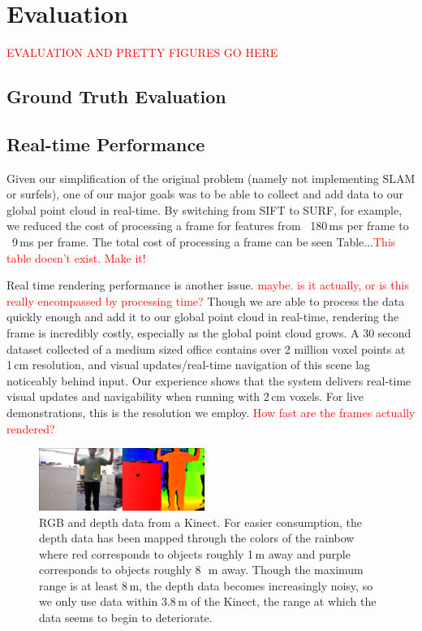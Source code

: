 \documentclass[letterpaper, 10pt, conference]{ieeeconf}
\newcommand{\xxx}[1]{\textcolor{red}{#1}}
\begin{document}
\section{Evaluation}
\xxx{EVALUATION AND PRETTY FIGURES GO HERE}
\subsection{Ground Truth Evaluation}

\subsection{Real-time Performance}
Given our simplification of the original problem (namely not implementing SLAM
or surfels), one of our major goals was to be able to collect and add data to
our global point cloud in real-time. By switching from SIFT to SURF, for
example, we reduced the cost of processing a frame for features from
~180\,ms per frame to ~9\,ms per frame. The total cost of processing a frame
can be seen Table...\xxx{This table doesn't exist. Make it!}

Real time rendering performance is another issue. \xxx{maybe. is it actually,
    or is this really encompassed by processing time?} Though we are able to
process the data quickly enough and add it to our global point cloud in
real-time, rendering the frame is incredibly costly, especially as the global
point cloud grows. A 30 second dataset collected of a medium sized office
contains over 2 million voxel points at 1\,cm resolution, and visual
updates/real-time navigation of this scene lag noticeably behind input. Our
experience shows that the system delivers real-time visual updates and
navigability when running with 2\,cm voxels. For live demonstrations, this is
the resolution we employ. \xxx{How fast are the frames actually rendered?}

\begin{figure}
\centering
\includegraphics[width=0.48\textwidth]{figures/KinectDemo.png}
\caption{RGB and depth data from a Kinect. For easier consumption, the depth
data has been mapped through the colors of the rainbow where red corresponds
to objects roughly 1\,m away and purple corresponds to objects roughly 8~\,m
away. Though the maximum range is at least 8\,m, the depth data
becomes increasingly noisy, so we only use data within 3.8\,m of the Kinect,
the range at which the data seems to begin to deteriorate.}
\label{fig:kinect-demo}
\end{figure}
\end{document}
